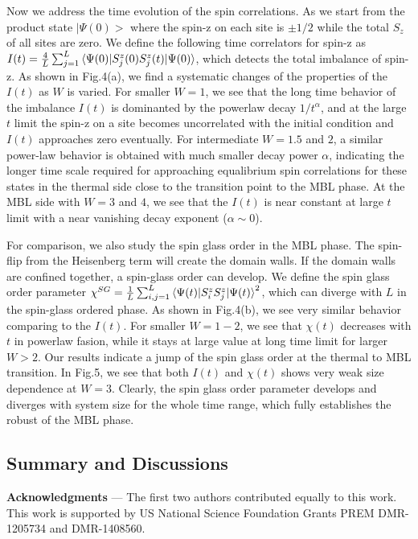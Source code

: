 \documentclass[prl,aps,epsf,showpacs,twocolumn]{revtex4}
\begin{document}
Now we address the time evolution of the spin correlations.  As we start from
the product state $|\Psi(0)>$ where the spin-z on each site is  $\pm 1/2$  while
the total $S_z$ of all sites are zero. We define the following time correlators
for spin-z  as $I(t)=\frac 4  L \sum_{j=1}^L
\braket{\Psi(0)|S_j^z(0)S_j^z(t)|\Psi(0)}$, which detects the  total imbalance of
spin-z. As shown in Fig.4(a),  we find a systematic changes of the properties of
the $I(t)$ as $W$ is varied.   For smaller $W=1$,  we see that the long time
behavior of the imbalance $I(t)$ is dominanted by the powerlaw decay
$1/t^{\alpha}$, and at the large $t$ limit  the spin-z on a site becomes
uncorrelated with the initial condition and $I(t)$ approaches zero eventually.
For intermediate $W=1.5$ and $2$,  a similar power-law behavior is obtained with
much smaller decay power $\alpha$, indicating the longer time scale required for
approaching equalibrium spin correlations for these states in the thermal side
close to the transition point to the MBL phase.  At the MBL side with $W=3$ and
$4$,  we see that the $I(t)$ is near constant at large $t$ limit with a near
vanishing decay exponent ($\alpha \sim 0$).

For comparison,  we also study the spin glass order  in the MBL phase.  The
spin-flip  from the Heisenberg term will create the domain walls.  If the
domain walls  are confined together, a spin-glass order can develop.  We define
the spin glass order parameter $ \chi^{SG}=\frac 1 L \sum_{i,j=1}^L
\braket{\Psi(t)|S_i^zS_j^z|\Psi(t)}^2$,  which can diverge with $L$ in the spin-glass
ordered phase.  As shown in Fig.4(b), we see very  similar behavior comparing to
the $I(t)$.  For smaller $W=1-2$,  we see that $\chi(t)$ decreases with $t$ in
powerlaw fasion, while it stays at large value at long time limit for larger
$W>2$.  Our  results indicate a jump of the spin glass order at the thermal to
MBL transition.  In Fig.5,  we see that both $I(t)$ and $\chi(t)$ shows very
weak size dependence at $W=3$.   Clearly, the spin glass order parameter
develops and diverges with system size for the whole time range, which  fully
establishes the robust of the MBL phase.  



\subsection{Summary and Discussions}



                                 

{\bf Acknowledgments} --- The first two authors contributed equally to this
work.  This work is supported by US National Science Foundation  Grants PREM
DMR-1205734 and DMR-1408560.




 
\end{document}
